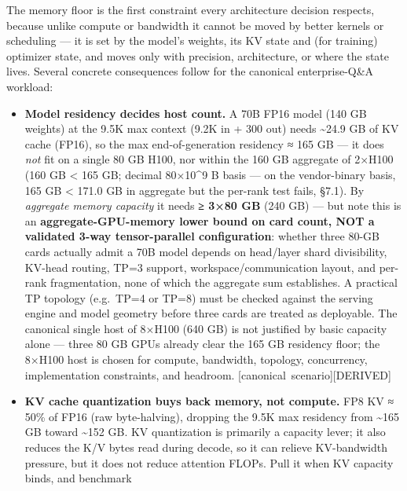 \label{architecture-consequence}


The memory floor is the first constraint every architecture decision
respects, because unlike compute or bandwidth it cannot be moved by
better kernels or scheduling --- it is set by the model's weights, its
KV state and (for training) optimizer state, and moves only with
precision, architecture, or where the state lives. Several concrete
consequences follow for the canonical enterprise-Q\&A workload:

\begin{itemize}
\item
  \textbf{Model residency decides host count.} A 70B FP16 model (140 GB
  weights) at the 9.5K max context (9.2K in + 300 out) needs
  \textasciitilde24.9 GB of KV cache (FP16), so the max
  end-of-generation residency ≈ 165 GB --- it does \emph{not} fit on a
  single 80 GB H100, nor within the 160 GB aggregate of 2×H100 (160 GB
  \textless{} 165 GB; decimal 80×10\^{}9 B basis --- on the
  vendor-binary basis, 165 GB \textless{} 171.0 GB in aggregate but the
  per-rank test fails, §7.1). By \emph{aggregate memory capacity} it
  needs \textbf{≥ 3×80 GB} (240 GB) --- but note this is an
  \textbf{aggregate-GPU-memory lower bound on card count, NOT a
  validated 3-way tensor-parallel configuration}: whether three 80-GB
  cards actually admit a 70B model depends on head/layer shard
  divisibility, KV-head routing, TP=3 support, workspace/communication
  layout, and per-rank fragmentation, none of which the aggregate sum
  establishes. A practical TP topology (e.g.~TP=4 or TP=8) must be
  checked against the serving engine and model geometry before three
  cards are treated as deployable. The canonical single host of 8×H100
  (640 GB) is not justified by basic capacity alone --- three 80 GB GPUs
  already clear the 165 GB residency floor; the 8×H100 host is chosen
  for compute, bandwidth, topology, concurrency, implementation
  constraints, and headroom. \mbox{{[}canonical scenario{]}}\hspace{0pt}\mbox{{[}DERIVED{]}}
\item
  \textbf{KV cache quantization buys back memory, not compute.} FP8 KV ≈
  50\% of FP16 (raw byte-halving), dropping the 9.5K max residency from
  \textasciitilde165 GB toward \textasciitilde152 GB. KV quantization is
  primarily a capacity lever; it also reduces the K/V bytes read during
  decode, so it can relieve KV-bandwidth pressure, but it does not
  reduce attention FLOPs. Pull it when KV capacity binds, and benchmark

\end{itemize}
